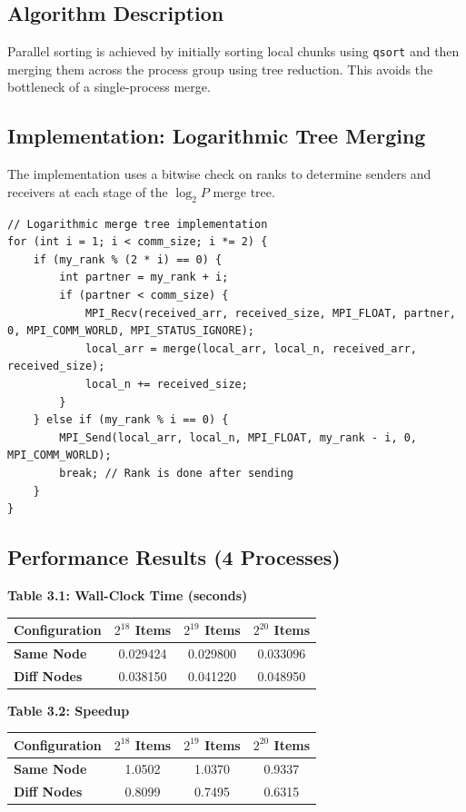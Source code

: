 \documentclass[11pt]{article}
\begin{document}
\subsection*{Algorithm Description}
Parallel sorting is achieved by initially sorting local chunks using \texttt{qsort} and then merging them across the process group using tree reduction. This avoids the bottleneck of a single-process merge.

\subsection*{Implementation: Logarithmic Tree Merging}
The implementation uses a bitwise check on ranks to determine senders and receivers at each stage of the $\log_2 P$ merge tree.

\begin{lstlisting}
// Logarithmic merge tree implementation
for (int i = 1; i < comm_size; i *= 2) {
    if (my_rank % (2 * i) == 0) {
        int partner = my_rank + i;
        if (partner < comm_size) {
            MPI_Recv(received_arr, received_size, MPI_FLOAT, partner, 0, MPI_COMM_WORLD, MPI_STATUS_IGNORE);
            local_arr = merge(local_arr, local_n, received_arr, received_size);
            local_n += received_size;
        }
    } else if (my_rank % i == 0) {
        MPI_Send(local_arr, local_n, MPI_FLOAT, my_rank - i, 0, MPI_COMM_WORLD);
        break; // Rank is done after sending
    }
}
\end{lstlisting}

\subsection*{Performance Results (4 Processes)}

\begin{center}
\textbf{Table 3.1: Wall-Clock Time (seconds)} \\
\begin{tabular}{@{}lccc@{}}
\toprule
Configuration & $2^{18}$ Items & $2^{19}$ Items & $2^{20}$ Items \\
\midrule
\textbf{Same Node} & 0.029424 & 0.029800 & 0.033096 \\
\textbf{Diff Nodes} & 0.038150 & 0.041220 & 0.048950 \\
\bottomrule
\end{tabular}
\end{center}

\begin{center}
\textbf{Table 3.2: Speedup} \\
\begin{tabular}{@{}lccc@{}}
\toprule
Configuration & $2^{18}$ Items & $2^{19}$ Items & $2^{20}$ Items \\
\midrule
\textbf{Same Node} & 1.0502 & 1.0370 & 0.9337 \\
\textbf{Diff Nodes} & 0.8099 & 0.7495 & 0.6315 \\
\bottomrule
\end{tabular}
\end{center}
\end{document}
